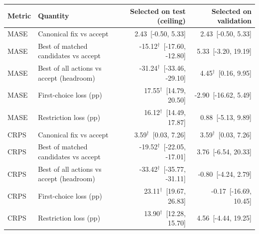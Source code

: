 \begin{tabular}{llrr}
\toprule
Metric & Quantity & Selected on test (ceiling) & Selected on validation \\
\midrule
MASE & Canonical fix vs accept & 2.43~[-0.50, 5.33] & 2.43~[-0.50, 5.33] \\
MASE & Best of matched candidates vs accept & -15.12$^\dagger$~[-17.60, -12.80] & 5.33~[-3.20, 19.19] \\
MASE & Best of all actions vs accept (headroom) & -31.24$^\dagger$~[-33.46, -29.10] & 4.45$^\dagger$~[0.16, 9.95] \\
MASE & First-choice loss (pp) & 17.55$^\dagger$~[14.79, 20.50] & -2.90~[-16.62, 5.49] \\
MASE & Restriction loss (pp) & 16.12$^\dagger$~[14.49, 17.87] & 0.88~[-5.13, 9.89] \\
CRPS & Canonical fix vs accept & 3.59$^\dagger$~[0.03, 7.26] & 3.59$^\dagger$~[0.03, 7.26] \\
CRPS & Best of matched candidates vs accept & -19.52$^\dagger$~[-22.05, -17.01] & 3.76~[-6.54, 20.33] \\
CRPS & Best of all actions vs accept (headroom) & -33.42$^\dagger$~[-35.77, -31.11] & -0.80~[-4.24, 2.79] \\
CRPS & First-choice loss (pp) & 23.11$^\dagger$~[19.67, 26.83] & -0.17~[-16.69, 10.45] \\
CRPS & Restriction loss (pp) & 13.90$^\dagger$~[12.28, 15.70] & 4.56~[-4.44, 19.25] \\
\bottomrule
\end{tabular}
